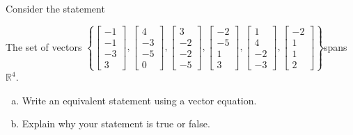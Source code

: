 
\begin{exerciseStatement}


Consider the statement 
\begin{center}\begin{minipage}{0.8\textwidth}
 The set of vectors \( \left\{ \left[\begin{array}{c}
-1 \\
-1 \\
-3 \\
3
\end{array}\right] , \left[\begin{array}{c}
4 \\
-3 \\
-5 \\
0
\end{array}\right] , \left[\begin{array}{c}
3 \\
-2 \\
-2 \\
-5
\end{array}\right] , \left[\begin{array}{c}
-2 \\
-5 \\
1 \\
3
\end{array}\right] , \left[\begin{array}{c}
1 \\
4 \\
-2 \\
-3
\end{array}\right] , \left[\begin{array}{c}
-2 \\
1 \\
1 \\
2
\end{array}\right] \right\} \)spans \(\mathbb{R}^4\). 
\end{minipage}\end{center}
    


\begin{enumerate}[(a)]
\item  Write an equivalent statement using a vector equation.
\item  Explain why your statement is true or false.
\end{enumerate}
    
\end{exerciseStatement}
    
